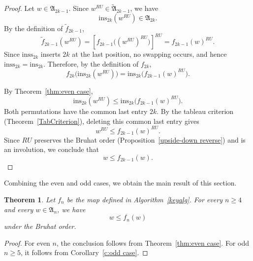\documentclass[12pt]{amsart}
\newtheorem{thm}{Theorem}[section]
\theoremstyle{definition}
\numberwithin{equation}{section}
\newcommand{\ins}[1]{\mathrm{ins}_{#1}}
\newcommand{\inss}[1]{\mathrm{inss}_{#1}}
\begin{document}
\begin{proof}
Let $w\in\mathfrak A_{2k-1}$. Since
$w^{RU}\in\widetilde{\mathfrak A}_{2k-1}$, we have
\begin{equation*}
\ins{2k}(w^{RU})\in\mathfrak A_{2k}.
\end{equation*}
By the definition of $\widetilde f_{2k-1}$,
\begin{equation*}
\widetilde f_{2k-1}(w^{RU})
=
\left[f_{2k-1}\bigl((w^{RU})^{RU}\bigr)\right]^{RU}
=
f_{2k-1}(w)^{RU}.
\end{equation*}
Since $\inss{2k}$ inserts $2k$ at the last position, no swapping occurs,
and hence $\inss{2k}=\ins{2k}$. Therefore, by the definition of
$f_{2k}$,
\begin{equation*}
f_{2k}\bigl(\ins{2k}(w^{RU})\bigr)
=
\ins{2k}\bigl(f_{2k-1}(w)^{RU}\bigr).
\end{equation*}

By Theorem~\ref{thm:even case},
\begin{equation*}
\ins{2k}(w^{RU})
\leq
\ins{2k}\bigl(f_{2k-1}(w)^{RU}\bigr).
\end{equation*}
Both permutations have the common last entry $2k$. By the tableau criterion (Theorem~\ref{TabCriterion}), deleting this common last entry gives
\begin{equation*}
w^{RU}\leq f_{2k-1}(w)^{RU}.
\end{equation*}
Since $RU$ preserves the Bruhat order (Proposition~\ref{upside-down reverse}) and is an involution, we conclude
that
\begin{equation*}
w\leq f_{2k-1}(w).
\end{equation*}
\end{proof}

Combining the even and odd cases, we obtain the main result of this section.


\begin{thm}\label{t:Bruhat balance case}
Let $f_n$ be the map defined in Algorithm~\ref{keyalg}. For every $n\geq 4$ and every $w\in\mathfrak A_n$, we have
\begin{equation*}
w\leq f_n(w)
\end{equation*}
under the Bruhat order.
\end{thm}



\begin{proof}
    For even \(n\), the conclusion follows from Theorem~\ref{thm:even case}. For odd \(n\ge5\), it follows from Corollary~\ref{c:odd case}.
\end{proof}
\end{document}
